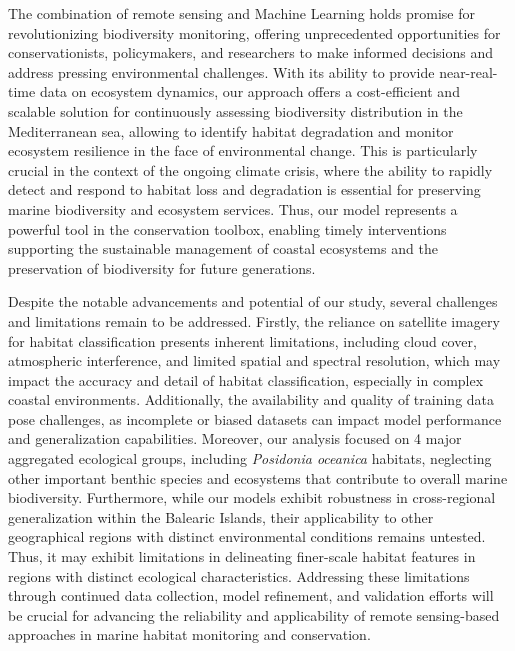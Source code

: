 The combination of remote sensing and Machine Learning holds promise for
revolutionizing biodiversity monitoring, offering unprecedented opportunities
for conservationists, policymakers, and researchers to make informed decisions
and address pressing environmental challenges. With its ability to provide
near-real-time data on ecosystem dynamics, our approach offers a cost-efficient
and scalable solution for continuously assessing biodiversity distribution in
the Mediterranean sea, allowing to identify habitat degradation and monitor
ecosystem resilience in the face of environmental change. This is particularly
crucial in the context of the ongoing climate crisis, where the ability to
rapidly detect and respond to habitat loss and degradation is essential for
preserving marine biodiversity and ecosystem services. Thus, our model
represents a powerful tool in the conservation toolbox, enabling timely
interventions supporting the sustainable management of coastal ecosystems and
the preservation of biodiversity for future generations.

Despite the notable advancements and potential of our study, several challenges
and limitations remain to be addressed. Firstly, the reliance on satellite
imagery for habitat classification presents inherent limitations, including
cloud cover, atmospheric interference, and limited spatial and spectral
resolution, which may impact the accuracy and detail of habitat classification,
especially in complex coastal environments. Additionally, the availability and
quality of training data pose challenges, as incomplete or biased datasets can
impact model performance and generalization capabilities. Moreover, our
analysis focused on 4 major aggregated ecological groups, including
\textit{Posidonia oceanica} habitats, neglecting other important benthic
species and ecosystems that contribute to overall marine biodiversity.
Furthermore, while our models exhibit robustness in cross-regional
generalization within the Balearic Islands, their applicability to other
geographical regions with distinct environmental conditions remains untested.
Thus, it may exhibit limitations in delineating finer-scale habitat features in
regions with distinct ecological characteristics. Addressing these limitations
through continued data collection, model refinement, and validation efforts
will be crucial for advancing the reliability and applicability of remote
sensing-based approaches in marine habitat monitoring and conservation.

